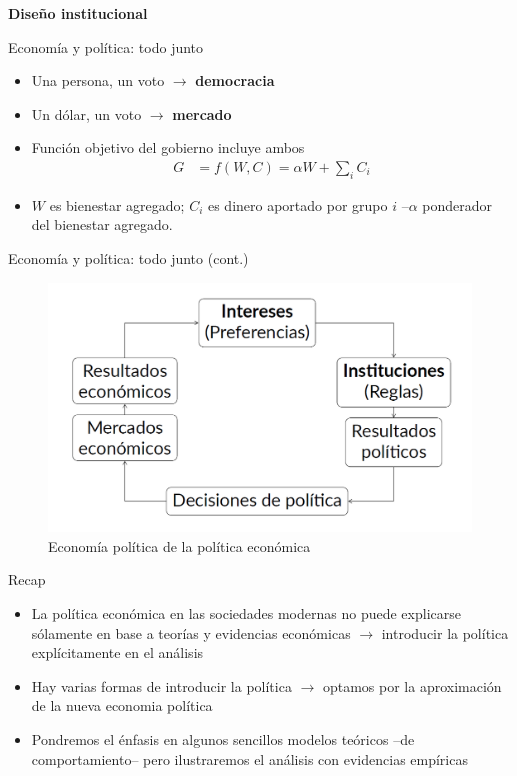 \documentclass[
  ignorenonframetext,
]{beamer}
\providecommand{\tightlist}{%
  \setlength{\itemsep}{0pt}\setlength{\parskip}{0pt}}\usepackage{longtable,booktabs,array}
\begin{document}
\begin{frame}{\textbf{Diseño institucional}}
\begin{block}{Economía y política: todo junto}
\protect\hypertarget{economuxeda-y-poluxedtica-todo-junto}{}
\begin{itemize}
\tightlist
\item
  Una persona, un voto \(\longrightarrow\) \textbf{democracia}
\item
  Un dólar, un voto \(\longrightarrow\) \textbf{mercado}
\item
  Función objetivo del gobierno incluye ambos \[\begin{aligned}
            G&=f(W,C)=\alpha W+\sum_{i}C_{i}
            \end{aligned}\]
\item
  \(W\) es bienestar agregado; \(C_{i}\) es dinero aportado por grupo
  \(i\) --\(\alpha\) ponderador del bienestar agregado.
\end{itemize}
\end{block}

\begin{block}{Economía y política: todo junto (cont.)}
\protect\hypertarget{economuxeda-y-poluxedtica-todo-junto-cont.}{}
\begin{figure}

{\centering \includegraphics{../epol/fig/fig-01-011.png}

}

\caption{Economía política de la política económica}

\end{figure}
\end{block}

\begin{block}{Recap}
\protect\hypertarget{recap}{}
\begin{itemize}
\tightlist
\item
  La política económica en las sociedades modernas no puede explicarse
  sólamente en base a teorías y evidencias económicas
  \(\longrightarrow\) introducir la política explícitamente en el
  análisis
\item
  Hay varias formas de introducir la política \(\longrightarrow\)
  optamos por la aproximación de la nueva economia política
\item
  Pondremos el énfasis en algunos sencillos modelos teóricos --de
  comportamiento-- pero ilustraremos el análisis con evidencias
  empíricas
\end{itemize}
\end{block}
\end{frame}
\end{document}
